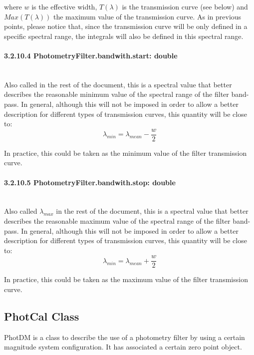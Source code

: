 \documentclass[11pt,a4paper]{ivoa}
\begin{document}
where $w$ is the effective width, $T(\lambda)$ is the transmission curve (see below) 
and $Max(T(\lambda))$ the maximum value of the transmission curve. As in previous points, 
please notice that, since the transmission curve will be only defined in a specific spectral 
range, the integrals will also be defined in this spectral range.
\par

\paragraph{3.2.10.4
PhotometryFilter.bandwith.start: double } \hspace{0pt} \\
Also called in the rest of the document, this is a spectral value that better describes 
the reasonable minimum value of the spectral range of the filter band-pass. In general,
although this 
will not be imposed in order to allow a better description for different types of 
transmission curves, this quantity will be close to:
\begin{equation} \label{eq:22}
\lambda_{min} = \lambda_{mean} - \frac{w}{2}
\end{equation}

In practice, this could be taken as the minimum value of the filter transmission curve.
\par

\paragraph{3.2.10.5
PhotometryFilter.bandwith.stop: double} \hspace{0pt} \\
Also called $\lambda_{max}$ in the rest of the document, this is a spectral value that 
better describes the reasonable maximum value of the spectral range of the filter band-pass. 
In general, 
although this will not be imposed in order to allow a better description for different 
types of transmission curves, this quantity will be close to:
\begin{equation} \label{eq:23}
\lambda_{min} = \lambda_{mean} + \frac{w}{2}
\end{equation}

In practice, this could be taken as the maximum value of the filter transmission 
curve.\par

\subsection{PhotCal Class}
PhotDM is a class to describe the use of a photometry filter by using a certain magnitude system 
configuration. It has associated a certain zero point object.
\par
\end{document}
